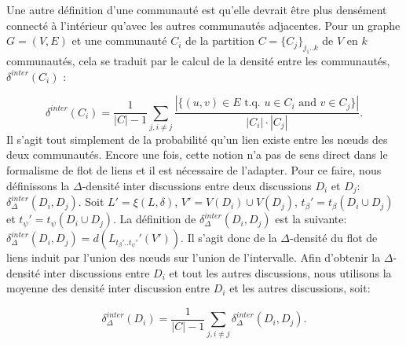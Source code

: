Une autre définition d'une communauté est qu'elle devrait être plus densément connecté à l'intérieur qu'avec les autres communautés adjacentes.
Pour un graphe $G=(V,E)$ et une communauté $C_i$ de la partition $C = \{C_j\}_{j_1..k}$ de $V$ en $k$ communautés, cela se traduit par le calcul de la densité entre les communautés, $\delta^{inter}(C_i)$ :

\begin{equation}
	\delta^{inter}(C_i) = \frac{1}{|C|-1}\sum_{j, i\ne j}\frac{|\{(u,v)\in E\mbox{ t.q. }u\in C_i\mbox{ and }v\in C_j\}|}{|C_i|\cdot |C_j|}.
\end{equation}
Il s'agit tout simplement de la probabilité qu'un lien existe entre les n\oe uds des deux communautés.
Encore une fois, cette notion n'a pas de sens direct dans le formalisme de flot de liens et il est nécessaire de l'adapter.
Pour ce faire, nous définissons la $\Delta$-densité inter discussions entre deux discussions $D_i$ et $D_j$: $\delta^{inter}_{\Delta}(D_i,D_j)$.
Soit $L'= \xi(L,\delta)$, $V'= V(D_i) \cup V(D_j)$, $t_{\beta}'=t_{\beta}(D_i \cup D_j)$ et $t_{\psi}'=t_{\psi}(D_i \cup D_j)$.
La définition de $\delta^{inter}_{\Delta}(D_i,D_j)$ est la suivante: $\delta^{inter}_{\Delta}(D_i,D_j) = d(L_{t_{\beta}'..t_{\psi}'}'(V'))$.
Il s'agit donc de la $\Delta$-densité du flot de liens induit par l'union des n\oe uds sur l'union de l'intervalle.
Afin d'obtenir la $\Delta$-densité inter discussions entre $D_i$ et tout les autres discussions, nous utilisons la moyenne des densité inter discussion entre $D_i$ et les autres discussions, soit:

\begin{equation}
	\delta^{inter}_{\Delta}(D_i) = \frac{1}{|C|-1}\sum_{j,i\ne j} \delta^{inter}_{\Delta}(D_i,D_j).
\end{equation}

